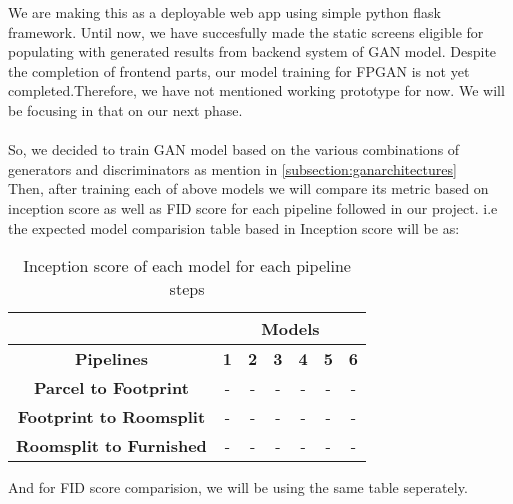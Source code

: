     We are making this as a deployable web app using simple python flask framework. Until now, we have succesfully made the static screens eligible for populating with generated results from backend system of GAN model. Despite the completion of frontend parts, our model training for FPGAN is not yet completed.Therefore, we have not mentioned working prototype for now. We will be focusing in that on our next phase.\\\\
    \break
    So, we decided to train GAN model based on the various combinations of generators and discriminators as mention in \ref{subsection:ganarchitectures}\\
    Then, after training each of above models we will compare its metric based on inception score as well as FID score for each pipeline followed in our project. i.e the expected model comparision table based in Inception score will be as: 
    \begin{table}[h]
        \centering
        \caption{Inception score of each model for each pipeline steps}
        \begin{tabular}{|c|c|c|c|c|c|c|}
            \hline
            &\multicolumn{6}{|c|}{Models} \\
            \hline
            \textbf{Pipelines} & \textbf{1} & \textbf{2} & \textbf{3} & \textbf{4} & \textbf{5} & \textbf{6}\\
            \hline
            \textbf{Parcel to Footprint} & - & - & - & - & - & -\\
            \hline
            \textbf{Footprint to Roomsplit} & - & - & - & - & - & -\\
            \hline
            \textbf{Roomsplit to Furnished} & - & - & - & - & - & -\\
            \hline
        \end{tabular} 
    \end{table}
    And for FID score comparision, we will be using the same table seperately.
   